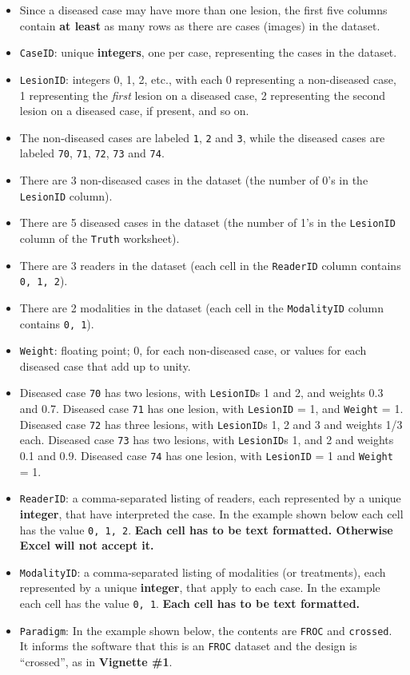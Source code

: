 \documentclass[]{book}
\providecommand{\tightlist}{%
  \setlength{\itemsep}{0pt}\setlength{\parskip}{0pt}}
\begin{document}
\begin{itemize}
\tightlist
\item
  Since a diseased case may have more than one lesion, the first five columns contain \textbf{at least} as many rows as there are cases (images) in the dataset.
\item
  \texttt{CaseID}: unique \textbf{integers}, one per case, representing the cases in the dataset.
\item
  \texttt{LesionID}: integers 0, 1, 2, etc., with each 0 representing a non-diseased case, 1 representing the \emph{first} lesion on a diseased case, 2 representing the second lesion on a diseased case, if present, and so on.
\item
  The non-diseased cases are labeled \texttt{1}, \texttt{2} and \texttt{3}, while the diseased cases are labeled \texttt{70}, \texttt{71}, \texttt{72}, \texttt{73} and \texttt{74}.
\item
  There are 3 non-diseased cases in the dataset (the number of 0's in the \texttt{LesionID} column).
\item
  There are 5 diseased cases in the dataset (the number of 1's in the \texttt{LesionID} column of the \texttt{Truth} worksheet).
\item
  There are 3 readers in the dataset (each cell in the \texttt{ReaderID} column contains \texttt{0,\ 1,\ 2}).
\item
  There are 2 modalities in the dataset (each cell in the \texttt{ModalityID} column contains \texttt{0,\ 1}).
\item
  \texttt{Weight}: floating point; 0, for each non-diseased case, or values for each diseased case that add up to unity.\\
\item
  Diseased case \texttt{70} has two lesions, with \texttt{LesionID}s 1 and 2, and weights 0.3 and 0.7. Diseased case \texttt{71} has one lesion, with \texttt{LesionID} = 1, and \texttt{Weight} = 1. Diseased case \texttt{72} has three lesions, with \texttt{LesionID}s 1, 2 and 3 and weights 1/3 each. Diseased case \texttt{73} has two lesions, with \texttt{LesionID}s 1, and 2 and weights 0.1 and 0.9. Diseased case \texttt{74} has one lesion, with \texttt{LesionID} = 1 and \texttt{Weight} = 1.
\item
  \texttt{ReaderID}: a comma-separated listing of readers, each represented by a unique \textbf{integer}, that have interpreted the case. In the example shown below each cell has the value \texttt{0,\ 1,\ 2}. \textbf{Each cell has to be text formatted. Otherwise Excel will not accept it.}
\item
  \texttt{ModalityID}: a comma-separated listing of modalities (or treatments), each represented by a unique \textbf{integer}, that apply to each case. In the example each cell has the value \texttt{0,\ 1}. \textbf{Each cell has to be text formatted.}
\item
  \texttt{Paradigm}: In the example shown below, the contents are \texttt{FROC} and \texttt{crossed}. It informs the software that this is an \texttt{FROC} dataset and the design is ``crossed'', as in \textbf{Vignette \#1}.
\end{itemize}
\end{document}
